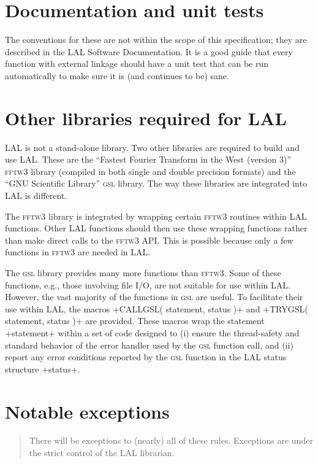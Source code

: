\documentclass[10pt]{ligodcc}
\makeatletter
\def\verb{\relax\ifmmode\hbox\else\leavevmode\null\fi
  \bgroup
    \color{blue}\small
    \verb@eol@error \let\do\@makeother \dospecials
    \verbatim@font\@noligs
    \@ifstar\@sverb\@verb}
\newlength{\fminilength}
\newenvironment{fminipage}[1][\linewidth]
  {\setlength{\fminilength}{#1-2\fboxsep-2\fboxrule}%
   \begin{lrbox}{\fminibox}\begin{minipage}{\fminilength}}
  {\end{minipage}\end{lrbox}\noindent\fbox{\usebox{\fminibox}}}
\newenvironment{lalrule}{\begin{quote}\color{red}\begin{fminipage}}
  {\end{fminipage}\end{quote}}
\makeatother
\begin{document}
\section{Documentation and unit tests}

The conventions for these are not within the scope of this specification;
they are described in the LAL Software Documentation.  It is a good guide
that every function with external linkage should have a unit test that can
be run automatically to make sure it is (and continues to be) sane.


\section{Other libraries required for LAL}

LAL is not a stand-alone library.  Two other libraries are required to build
and use LAL.  These are the ``Fastest Fourier Transform in the West (version
3)'' \textsc{fftw3} library (compiled in both single and double precision
formats) and the ``GNU Scientific Library'' \textsc{gsl} library.  The way
these libraries are integrated into LAL is different.

The \textsc{fftw3} library is integrated by wrapping certain \textsc{fftw3}
routines within LAL functions.  Other LAL functions should then use these
wrapping functions rather than make direct calls to the \textsc{fftw3} API.
This is possible because only a few functions in \textsc{fftw3} are needed
in LAL.

The \textsc{gsl} library provides many more functions than \textsc{fftw3}.
Some of these functions, e.g., those involving file I/O, are not suitable
for use within LAL.  However, the vast majority of the functions in
\textsc{gsl} are useful.  To facilitate their use within LAL, the macros
\verb+CALLGSL( statement, status )+ and \verb+TRYGSL( statement, status )+
are provided.  These macros wrap the statement \verb+statement+ within a
set of code designed to (i) ensure the thread-safety and standard behavior of
the error handler used by the \textsc{gsl} function call, and (ii) report
any error conditions reported by the \textsc{gsl} function in the LAL
status structure \verb+status+.


\section{Notable exceptions}

\begin{lalrule}
There will be exceptions to (nearly) all of these rules.  Exceptions are
under the strict control of the LAL librarian.
\end{lalrule}
\end{document}
